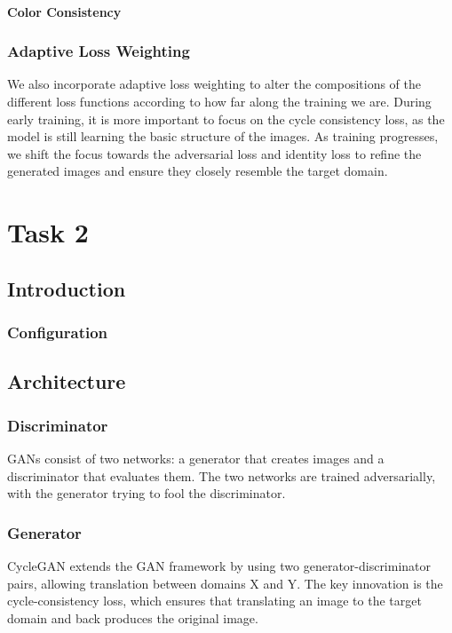 \documentclass[twoside,english,notitlepage]{report}
\begin{document}
\subsubsection{Color Consistency}


\subsection{Adaptive Loss Weighting}
We also incorporate adaptive loss weighting to alter the compositions of the different loss functions according to how far along the training we are. During early training, it is more important to focus on the cycle consistency loss, as the model is still learning the basic structure of the images. As training progresses, we shift the focus towards the adversarial loss and identity loss to refine the generated images and ensure they closely resemble the target domain.






\chapter{Task 2}
\section{Introduction}



\subsection{Configuration}



\section{Architecture}
\subsection{Discriminator}
GANs consist of two networks: a generator that creates images and a discriminator that evaluates them. The two networks are trained adversarially, with the generator trying to fool the discriminator.

\subsection{Generator}
CycleGAN extends the GAN framework by using two generator-discriminator pairs, allowing translation between domains X and Y. The key innovation is the cycle-consistency loss, which ensures that translating an image to the target domain and back produces the original image.
\end{document}
